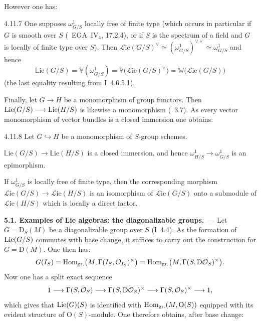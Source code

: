 However one has:

\begin{lemma}{4.11.7}
\label{II.4.11.7}
One supposes \(\omega^1_{G/S}\) locally free of finite type (which occurs in
particular if \(G\) is smooth over \(S\) (\cf\ EGA~IV\(_4\), 17.2.4), or if
\(S\) is the spectrum of a field and \(G\) is locally of finite type over
\(S\)). Then
\(\mathcal{L}\mathrm{ie}(G/S)^{\vee}
\simeq(\omega^1_{G/S})^{\vee\vee}
\simeq\omega^1_{G/S}\)
and hence
\[
\mathbb{L}\mathrm{ie}(G/S)
=\mathbb{V}(\omega^1_{G/S})
=\mathbb{V}\bigl(\mathcal{L}\mathrm{ie}(G/S)^{\vee}\bigr)
=\mathbb{W}\bigl(\mathcal{L}\mathrm{ie}(G/S)\bigr)
\]
(the last equality resulting from I~4.6.5.1).
\end{lemma}

Finally, let \(G\to H\) be a monomorphism of group functors. Then
\(\operatorname{Lie}(G/S)\longrightarrow\operatorname{Lie}(H/S)\) is likewise a monomorphism (\cf~3.7). As every
vector monomorphism of vector bundles is a closed
immersion{\renewcommand{\thefootnote}{(91)}}
one obtains:

\begin{corollary}{4.11.8}
\label{II.4.11.8}
Let \(G\hookrightarrow H\) be a monomorphism of \(S\)-group schemes.
\begin{enumeratei}
\item \(\mathbb{L}\mathrm{ie}(G/S)\to\mathbb{L}\mathrm{ie}(H/S)\) is a closed
immersion, and hence \(\omega^1_{H/S}\to\omega^1_{G/S}\) is an epimorphism.
\item If \(\omega^1_{G/S}\) is locally free of finite type, then the
corresponding morphism
\(\mathcal{L}\mathrm{ie}(G/S)\to\mathcal{L}\mathrm{ie}(H/S)\) is an
isomorphism of \(\mathcal{L}\mathrm{ie}(G/S)\) onto a submodule of
\(\mathcal{L}\mathrm{ie}(H/S)\) which is locally a direct factor.
\end{enumeratei}
\end{corollary}

\label{II.sec.5}

\par{}%
\noindent\textbf{5.1. Examples of Lie algebras: the diagonalizable groups.}\ ---
\label{II.ssec.5.1}
Let \(G=\mathrm{D}_S(M)\) be a diagonalizable group over \(S\) (I~4.4). As the
formation of \(\operatorname{Lie}(G/S)\) commutes with base change, it suffices to carry
out the construction for \(G=\mathrm{D}(M)\). One then has:
\[
G(I_S)
=\operatorname{Hom}_{\mathrm{gr.}}\bigl(M,\Gamma(I_S,\mathcal{O}_{I_S})^{\times}\bigr)
=\operatorname{Hom}_{\mathrm{gr.}}\bigl(M,\Gamma(S,\mathrm{D}\mathcal{O}_S)^{\times}\bigr).
\]
Now one has a split exact sequence
\[
1\longrightarrow\Gamma(S,\mathcal{O}_S)\longrightarrow\Gamma(S,\mathrm{D}\mathcal{O}_S)^{\times}
\longrightarrow\Gamma(S,\mathcal{O}_S)^{\times}\longrightarrow 1,
\]
which gives that \(\operatorname{Lie}(G)(S)\) is identified with
\(\operatorname{Hom}_{\mathrm{gr.}}(M,\mathrm{O}(S))\) equipped with its evident structure
of \(\mathrm{O}(S)\)-module. One therefore obtains, after base change:

